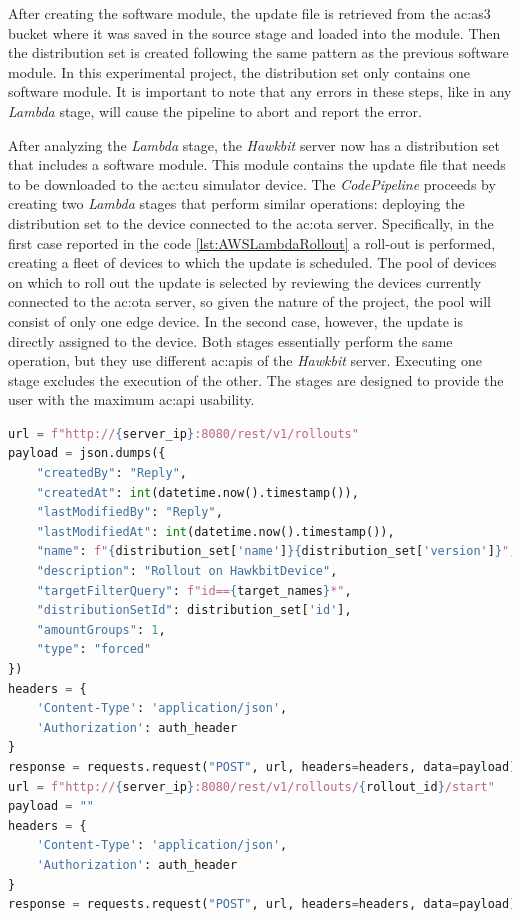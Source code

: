 After creating the software module, the update file is retrieved from the \gls{ac:as3} bucket where it was saved in the source stage and loaded into the module. Then the distribution set is created following the same pattern as the previous software module. In this experimental project, the distribution set only contains one software module. It is important to note that any errors in these steps, like in any \textit{Lambda} stage, will cause the pipeline to abort and report the error.

After analyzing the \textit{Lambda} stage, the \textit{Hawkbit} server now has a distribution set that includes a software module. This module contains the update file that needs to be downloaded to the \gls{ac:tcu} simulator device. The \textit{CodePipeline} proceeds by creating two \textit{Lambda} stages that perform similar operations: deploying the distribution set to the device connected to the \gls{ac:ota} server. Specifically, in the first case reported in the code \ref{lst:AWSLambdaRollout} a roll-out is performed, creating a fleet of devices to which the update is scheduled. The pool of devices on which to roll out the update is selected by reviewing the devices currently connected to the \gls{ac:ota} server, so given the nature of the project, the pool will consist of only one edge device. In the second case, however, the update is directly assigned to the device. Both stages essentially perform the same operation, but they use different \gls{ac:api}s of the \textit{Hawkbit} server. Executing one stage excludes the execution of the other. The stages are designed to provide the user with the maximum \gls{ac:api} usability. 
\begin{lstlisting}[language=Python, caption={Lambda code for the roll out creation and execution}, label=lst:AWSLambdaRollout]
url = f"http://{server_ip}:8080/rest/v1/rollouts"
payload = json.dumps({
    "createdBy": "Reply",
    "createdAt": int(datetime.now().timestamp()),
    "lastModifiedBy": "Reply",
    "lastModifiedAt": int(datetime.now().timestamp()),
    "name": f"{distribution_set['name']}{distribution_set['version']}",
    "description": "Rollout on HawkbitDevice",
    "targetFilterQuery": f"id=={target_names}*",
    "distributionSetId": distribution_set['id'],
    "amountGroups": 1,
    "type": "forced"
})
headers = {
    'Content-Type': 'application/json',
    'Authorization': auth_header
}
response = requests.request("POST", url, headers=headers, data=payload)
url = f"http://{server_ip}:8080/rest/v1/rollouts/{rollout_id}/start"
payload = ""
headers = {
    'Content-Type': 'application/json',
    'Authorization': auth_header
}
response = requests.request("POST", url, headers=headers, data=payload)
\end{lstlisting}

